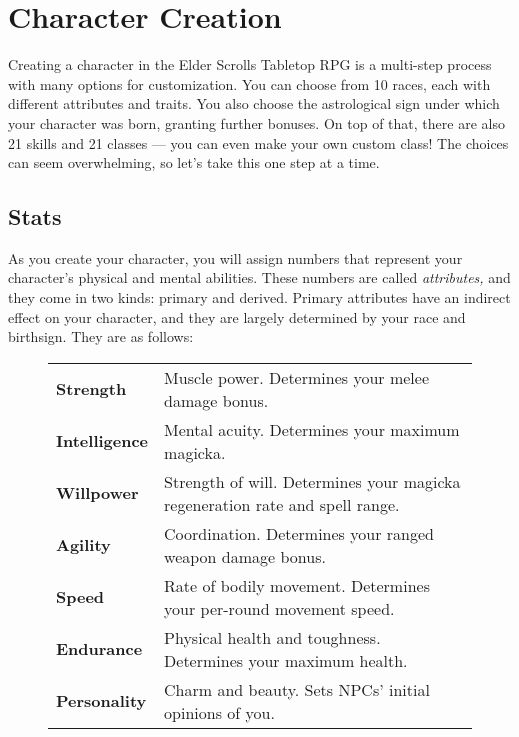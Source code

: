 \chapter{Character Creation}
Creating a character in the Elder Scrolls Tabletop RPG is a multi-step process with many options for customization. You can choose from 10 races, each with different attributes and traits. You also choose the astrological sign under which your character was born, granting further bonuses. On top of that, there are also 21 skills and 21 classes --- you can even make your own custom class! The choices can seem overwhelming, so let's take this one step at a time.

\section{Stats}

As you create your character, you will assign numbers that represent your character's physical and mental abilities. These numbers are called \textit{attributes,} and they come in two kinds: primary and derived. Primary attributes have an indirect effect on your character, and they are largely determined by your race and birthsign. They are as follows:

\begin{figure}[h]
\begin{tabular}[h]{p{}p{}}
	\textbf{Strength} & Muscle power. Determines your melee damage bonus.\\
	\textbf{Intelligence} & Mental acuity. Determines your maximum magicka.\\
	\textbf{Willpower} & Strength of will. Determines your magicka regeneration rate and spell range.\\
	\textbf{Agility} & Coordination. Determines your ranged weapon damage bonus.\\
	\textbf{Speed} & Rate of bodily movement. Determines your per-round movement speed.\\
	\textbf{Endurance} & Physical health and toughness. Determines your maximum health.\\
	\textbf{Personality} & Charm and beauty. Sets NPCs' initial opinions of you.\\
\end{tabular}
\end{figure}

